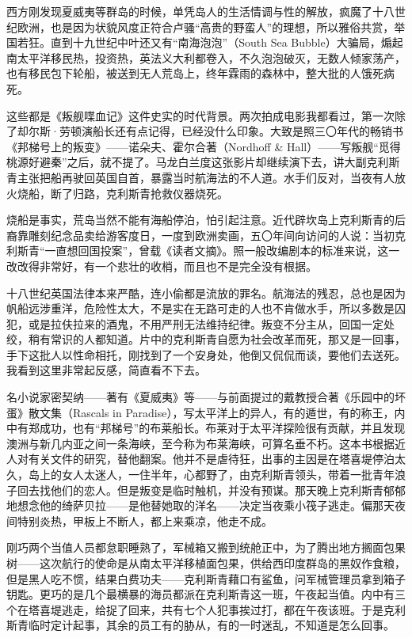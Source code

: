 \par 西方刚发现夏威夷等群岛的时候，单凭岛人的生活情调与性的解放，疯魔了十八世纪欧洲，也是因为状貌风度正符合卢骚“高贵的野蛮人”的理想，所以雅俗共赏，举国若狂。直到十九世纪中叶还又有“南海泡泡”（South Sea Bubble）大骗局，煽起南太平洋移民热，投资热，英法义大利都卷入，不久泡泡破灭，无数人倾家荡产，也有移民包下轮船，被送到无人荒岛上，终年霖雨的森林中，整大批的人饿死病死。
\par 这些都是《叛舰喋血记》这件史实的时代背景。两次拍成电影我都看过，第一次除了却尔斯·劳顿演船长还有点记得，已经没什么印象。大致是照三〇年代的畅销书《邦梯号上的叛变》——诺朵夫、霍尔合著（Nordhoff \& Hall）——写叛舰“觅得桃源好避秦”之后，就不提了。马龙白兰度这张影片却继续演下去，讲大副克利斯青主张把船再驶回英国自首，暴露当时航海法的不人道。水手们反对，当夜有人放火烧船，断了归路，克利斯青抢救仪器烧死。
\par 烧船是事实，荒岛当然不能有海船停泊，怕引起注意。近代辟坎岛上克利斯青的后裔靠雕刻纪念品卖给游客度日，一度到欧洲卖画，五〇年间向访问的人说：当初克利斯青“一直想回国投案”，曾载《读者文摘》。照一般改编剧本的标准来说，这一改改得非常好，有一个悲壮的收梢，而且也不是完全没有根据。
\par 十八世纪英国法律本来严酷，连小偷都是流放的罪名。航海法的残忍，总也是因为帆船远涉重洋，危险性太大，不是实在无路可走的人也不肯做水手，所以多数是囚犯，或是拉伕拉来的酒鬼，不用严刑无法维持纪律。叛变不分主从，回国一定处绞，稍有常识的人都知道。片中的克利斯青自愿为社会改革而死，那又是一回事，手下这批人以性命相托，刚找到了一个安身处，他倒又侃侃而谈，要他们去送死。我看到这里非常起反感，简直看不下去。
\par 名小说家密契纳——著有《夏威夷》等——与前面提过的戴教授合著《乐园中的坏蛋》散文集（Rascals in Paradise），写太平洋上的异人，有的遁世，有的称王，内中有郑成功，也有“邦梯号”的布莱船长。布莱对于太平洋探险很有贡献，并且发现澳洲与新几内亚之间一条海峡，至今称为布莱海峡，可算名垂不朽。这本书根据近人对有关文件的研究，替他翻案。他并不是虐待狂，出事的主因是在塔喜堤停泊太久，岛上的女人太迷人，一住半年，心都野了，由克利斯青领头，带着一批青年浪子回去找他们的恋人。但是叛变是临时触机，并没有预谋。那天晚上克利斯青郁郁地想念他的绮萨贝拉——是他替她取的洋名——决定当夜乘小筏子逃走。偏那天夜间特别炎热，甲板上不断人，都上来乘凉，他走不成。
\par 刚巧两个当值人员都怠职睡熟了，军械箱又搬到统舱正中，为了腾出地方搁面包果树——这次航行的使命是从南太平洋移植面包果，供给西印度群岛的黑奴作食粮，但是黑人吃不惯，结果白费功夫——克利斯青藉口有鲨鱼，问军械管理员拿到箱子钥匙。更巧的是几个最横暴的海员都派在克利斯青这一班，午夜起当值。内中有三个在塔喜堤逃走，给捉了回来，共有七个人犯事挨过打，都在午夜该班。于是克利斯青临时定计起事，其余的员工有的胁从，有的一时迷乱，不知道是怎么回事。
